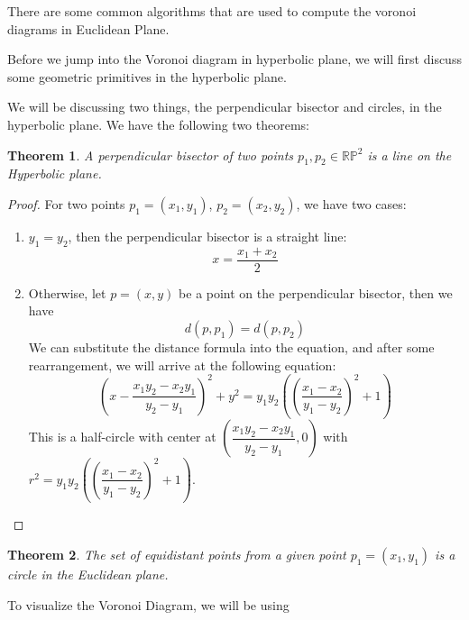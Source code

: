 \documentclass[minted, draw]{hebdomon}
\newcommand{\RP}{{\mathbb{R}\mathbb{P} }}
\newtheorem{theorem}{Theorem}
\begin{document}

There are some common algorithms that are used to compute the voronoi diagrams in Euclidean Plane. 



Before we jump into the Voronoi diagram in hyperbolic plane, we will first discuss some geometric primitives in the hyperbolic plane. 

We will be discussing two things, the perpendicular bisector and circles, in the hyperbolic plane. We have the following two theorems:

\begin{theorem}
    A perpendicular bisector of two points $p_1, p_2 \in \RP^2$ is a line on the Hyperbolic plane. 
\end{theorem}

\begin{proof}
    For two points $p_1 = (x_1, y_1)$, $p_2 = (x_2, y_2)$, we have two cases:
    \begin{enumerate}
        \item $y_1 = y_2$, then the perpendicular bisector is a straight line:
        \[
        x = \frac{x_1 + x_2}{2}
        \]
        \item Otherwise, let $p = (x,y)$ be a point on the perpendicular bisector, then we have
        \[
            d(p, p_1) = d(p, p_2)
        \]
        We can substitute the distance formula into the equation, and after some rearrangement, we will arrive at the following equation:
        \[
        \left (x-\dfrac{x_1y_2-x_2y_1}{y_2-y_1} \right)^2 + y^2 = y_1y_2 \left ( \left ( \dfrac{x_1-x_2}{y_1-y_2}\right )^2 + 1 \right )
        \]
        This is a half-circle with center at $\left (\dfrac{x_1y_2-x_2y_1}{y_2-y_1}, 0 \right)$ with $r^2 = y_1y_2 \left ( \left ( \dfrac{x_1-x_2}{y_1-y_2}\right )^2 + 1 \right )$.
    \end{enumerate}
\end{proof}

\begin{theorem}
    The set of equidistant points from a given point $p_1 = (x_1, y_1)$ is a circle in the Euclidean plane.
\end{theorem}






To visualize the Voronoi Diagram, we will be using


\end{document}
